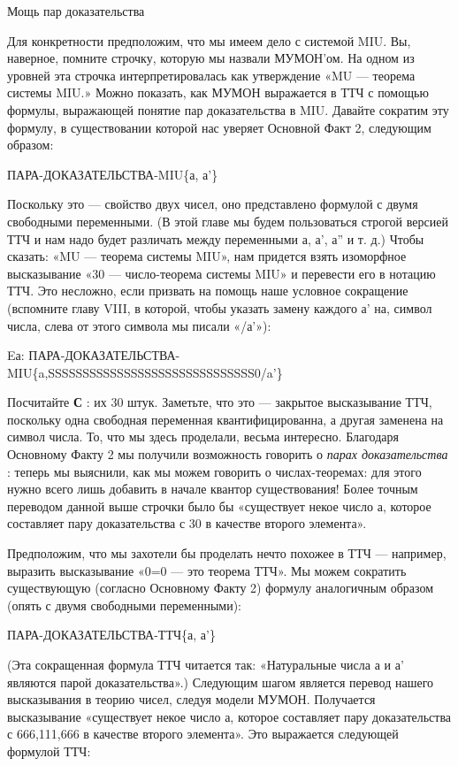 \documentclass[../main.tex]{subfiles}
\begin{document}
Мощь пар доказательства

Для конкретности предположим, что мы имеем дело с системой MIU. Вы, наверное, помните строчку, которую мы назвали МУМОН'ом. На одном из уровней эта строчка интерпретировалась как утверждение «MU --- теорема системы MIU.» Можно показать, как МУМОН выражается в ТТЧ с помощью формулы, выражающей понятие пар доказательства в MIU. Давайте сократим эту формулу, в существовании которой нас уверяет Основной Факт 2, следующим образом:

ПАРА-ДОКАЗАТЕЛЬСТВА-MIU\{а, а'\}

Поскольку это --- свойство двух чисел, оно представлено формулой с двумя свободными переменными. (В этой главе мы будем пользоваться строгой версией ТТЧ и нам надо будет различать между переменными а, а', а'' и т. д.) Чтобы сказать: «MU --- теорема системы MIU», нам придется взять изоморфное высказывание «30 --- число-теорема системы MIU» и перевести его в нотацию ТТЧ. Это несложно, если призвать на помощь наше условное сокращение (вспомните главу VIII, в которой, чтобы указать замену каждого а' на, символ числа, слева от этого символа мы писали «/а'»):

Eа: ПАРА-ДОКАЗАТЕЛЬСТВА-MIU\{a,SSSSSSSSSSSSSSSSSSSSSSSSSSSSSS0/a'\}

Посчитайте \textbf{С} : их 30 штук. Заметьте, что это --- закрытое высказывание ТТЧ, поскольку одна свободная переменная квантифицированна, а другая заменена на символ числа. То, что мы здесь проделали, весьма интересно. Благодаря Основному Факту 2 мы получили возможность говорить о \emph{парах доказательства} : теперь мы выяснили, как мы можем говорить о числах-теоремах: для этого нужно всего лишь добавить в начале квантор существования! Более точным переводом данной выше строчки было бы «существует некое число а, которое составляет пару доказательства с 30 в качестве второго элемента».

Предположим, что мы захотели бы проделать нечто похожее в ТТЧ --- например, выразить высказывание «0=0 --- это теорема ТТЧ». Мы можем сократить существующую (согласно Основному Факту 2) формулу аналогичным образом (опять с двумя свободными переменными):

ПАРА-ДОКАЗАТЕЛЬСТВА-ТТЧ\{а, а'\}

(Эта сокращенная формула ТТЧ читается так: «Натуральные числа а и а' являются парой доказательства».) Следующим шагом является перевод нашего высказывания в теорию чисел, следуя модели МУМОН. Получается высказывание «существует некое число а, которое составляет пару доказательства с 666,111,666 в качестве второго элемента». Это выражается следующей формулой ТТЧ:
\end{document}

